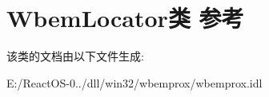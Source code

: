 \hypertarget{class_wbem_locator}{}\section{Wbem\+Locator类 参考}
\label{class_wbem_locator}


该类的文档由以下文件生成\+:\begin{DoxyCompactItemize}
\item 
E\+:/\+React\+O\+S-\/0../dll/win32/wbemprox/wbemprox.\+idl\end{DoxyCompactItemize}
